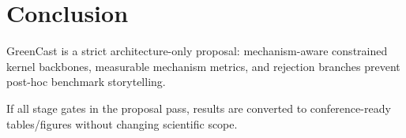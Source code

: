 \documentclass[11pt]{article}
\begin{document}
\section{Conclusion}
GreenCast is a strict architecture-only proposal: mechanism-aware constrained kernel backbones, measurable mechanism metrics, and rejection branches prevent post-hoc benchmark storytelling.

If all stage gates in the proposal pass, results are converted to conference-ready tables/figures without changing scientific scope.



\end{document}
